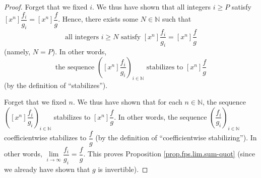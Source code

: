 \begin{fineprint}
\begin{proof}
Forget that we fixed $i$. We thus have shown that all integers $i\geq P$
satisfy $\left[  x^{n}\right]  \dfrac{f_{i}}{g_{i}}=\left[  x^{n}\right]
\dfrac{f}{g}$. Hence, there exists some $N\in\mathbb{N}$ such that%
\[
\text{all integers }i\geq N\text{ satisfy }\left[  x^{n}\right]  \dfrac{f_{i}%
}{g_{i}}=\left[  x^{n}\right]  \dfrac{f}{g}%
\]
(namely, $N=P$). In other words,%
\[
\text{the sequence }\left(  \left[  x^{n}\right]  \dfrac{f_{i}}{g_{i}}\right)
_{i\in\mathbb{N}}\text{ stabilizes to }\left[  x^{n}\right]  \dfrac{f}{g}%
\]
(by the definition of \textquotedblleft stabilizes\textquotedblright).

Forget that we fixed $n$. We thus have shown that for each $n\in\mathbb{N}$,
the sequence $\left(  \left[  x^{n}\right]  \dfrac{f_{i}}{g_{i}}\right)
_{i\in\mathbb{N}}$ stabilizes to $\left[  x^{n}\right]  \dfrac{f}{g}$. In
other words, the sequence $\left(  \dfrac{f_{i}}{g_{i}}\right)  _{i\in
\mathbb{N}}$ coefficientwise stabilizes to $\dfrac{f}{g}$ (by the definition
of \textquotedblleft coefficientwise stabilizing\textquotedblright). In other
words, $\lim\limits_{i\rightarrow\infty}\dfrac{f_{i}}{g_{i}}=\dfrac{f}{g}$.
This proves Proposition \ref{prop.fps.lim.sum-quot} (since we already have
shown that $g$ is invertible).
\end{proof}
\end{fineprint}

